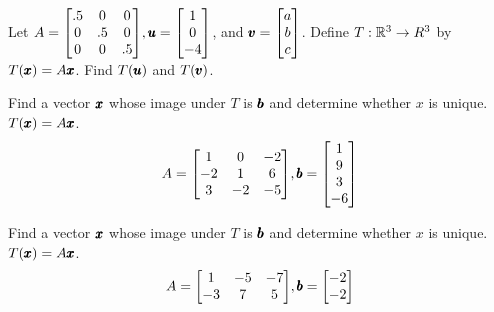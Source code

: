 \documentclass{../mathhomework}
\newenvironment{Mat}{\begin{bmatrix}}{\end{bmatrix}}
\begin{document}
\begin{problem}[1.8\#2]
    Let $A = \begin{Mat}
        .5 & 0 & 0 \\
        0 & .5 & 0 \\
        0 & 0 & .5 \\
    \end{Mat}, \Vect{u} = \begin{Mat}
        1 \\ 0 \\ -4
    \end{Mat}$, and $\Vect{v} = \begin{Mat}
        a \\ b \\ c
    \end{Mat}$. Define $T: \mathbb{R}^3 \to R^3$ by $T(\pmb{x}) = A\pmb{x}$. Find $T(\pmb{u})$ and $T(\pmb{v})$.
\end{problem}

\begin{problem}[1.8\#3]
    Find a vector $\pmb{x}$ whose image under $T$ is $\pmb{b}$ and determine whether $x$ is unique. $T(\pmb{x}) = A\pmb{x}$.
    \begin{equation*}
        A = \begin{Mat}
            1 & 0 & -2 \\
            -2 & 1 & 6 \\
            3 & -2 & -5
        \end{Mat},
        \Vect{b} = \begin{Mat}
            1 \\ 9 \\ 3 \\ -6
        \end{Mat}
    \end{equation*}
\end{problem}

\begin{problem}[1.8\#5]
    Find a vector $\pmb{x}$ whose image under $T$ is $\pmb{b}$ and determine whether $x$ is unique. $T(\pmb{x}) = A\pmb{x}$.
    \begin{equation*}
        A = \begin{Mat}
            1 & -5 & -7 \\
            -3 & 7 & 5
        \end{Mat},
        \Vect{b} = \begin{Mat}
            -2 \\ -2
        \end{Mat}
    \end{equation*}
\end{problem}
\end{document}

